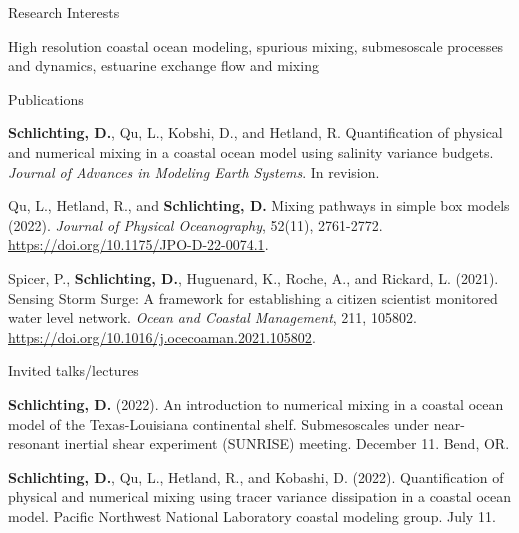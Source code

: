 \documentclass{resume} %
\begin{document}
\begin{rSection}{Research Interests}
\vspace{-10pt}
\item High resolution coastal ocean modeling, spurious mixing, submesoscale processes and dynamics, estuarine exchange flow and mixing

\end{rSection}

\begin{rSection}{Publications}
\vspace{-3pt}

\begin{etaremune}
\item \textbf{Schlichting, D.}, Qu, L., Kobshi, D., and Hetland, R. Quantification of physical and numerical mixing in a coastal ocean model using salinity variance budgets. \textit{Journal of Advances in Modeling Earth Systems}. In revision.
\item Qu, L., Hetland, R., and \textbf{Schlichting, D.} Mixing pathways in simple box models (2022). \textit{Journal of Physical Oceanography}, 52(11), 2761-2772. \url{https://doi.org/10.1175/JPO-D-22-0074.1}.
\item Spicer, P., \textbf{Schlichting, D.}, Huguenard, K., Roche, A., and Rickard, L. (2021). Sensing Storm Surge: A framework for establishing a citizen scientist monitored water level network. \textit{Ocean and Coastal Management}, 211, 105802. \url{https://doi.org/10.1016/j.ocecoaman.2021.105802}.
\end{etaremune}
\end{rSection}

\begin{rSection}{Invited talks/lectures}
\vspace{-3pt}

\begin{etaremune}
    \item \textbf{Schlichting, D.} (2022). An introduction to numerical mixing in a coastal ocean model of the Texas-Louisiana continental shelf. Submesoscales under near-resonant inertial shear experiment (SUNRISE) meeting. December 11. Bend, OR.
    \item \textbf{Schlichting, D.}, Qu, L., Hetland, R., and Kobashi, D. (2022). Quantification of physical and numerical mixing using tracer variance dissipation in a coastal ocean model. Pacific Northwest National Laboratory coastal modeling group. July 11.
\end{etaremune}
\end{rSection}
\end{document}
